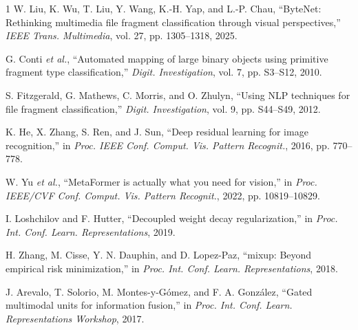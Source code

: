 \documentclass[journal]{IEEEtran}
\begin{document}
\begin{thebibliography}{1}
W. Liu, K. Wu, T. Liu, Y. Wang, K.-H. Yap, and L.-P. Chau, ``ByteNet: Rethinking multimedia file fragment classification through visual perspectives,'' \emph{IEEE Trans. Multimedia}, vol. 27, pp. 1305--1318, 2025.

G. Conti \textit{et al.}, ``Automated mapping of large binary objects using primitive fragment type classification,'' \emph{Digit. Investigation}, vol. 7, pp. S3--S12, 2010.

S. Fitzgerald, G. Mathews, C. Morris, and O. Zhulyn, ``Using NLP techniques for file fragment classification,'' \emph{Digit. Investigation}, vol. 9, pp. S44--S49, 2012.

K. He, X. Zhang, S. Ren, and J. Sun, ``Deep residual learning for image recognition,'' in \emph{Proc. IEEE Conf. Comput. Vis. Pattern Recognit.}, 2016, pp. 770--778.

W. Yu \textit{et al.}, ``MetaFormer is actually what you need for vision,'' in \emph{Proc. IEEE/CVF Conf. Comput. Vis. Pattern Recognit.}, 2022, pp. 10819--10829.

I. Loshchilov and F. Hutter, ``Decoupled weight decay regularization,'' in \emph{Proc. Int. Conf. Learn. Representations}, 2019.

H. Zhang, M. Cisse, Y. N. Dauphin, and D. Lopez-Paz, ``mixup: Beyond empirical risk minimization,'' in \emph{Proc. Int. Conf. Learn. Representations}, 2018.

J. Arevalo, T. Solorio, M. Montes-y-G\'omez, and F. A. Gonz\'alez, ``Gated multimodal units for information fusion,'' in \emph{Proc. Int. Conf. Learn. Representations Workshop}, 2017.
\end{thebibliography}
\end{document}
